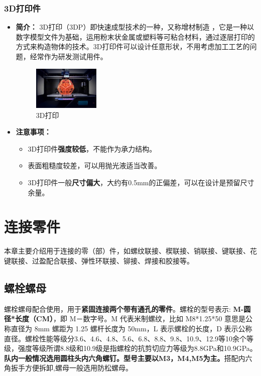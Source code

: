 \documentclass[UTF8]{article} %
\begin{document}
\subsubsection{3D打印件}

\begin{itemize}
  \item \textbf{简介：} 3D打印（3DP）即快速成型技术的一种，又称增材制造 ，它是一种以数字模型文件为基础，运用粉末状金属或塑料等可粘合材料，通过逐层打印的方式来构造物体的技术。3D打印件可以设计任意形状，不用考虑加工工艺的问题，经常作为研发测试用件。
  
  \begin{figure}[h]
    \centering
    \includegraphics[width=0.3\textwidth]{3.png}
    \caption{3D打印}
  \end{figure}

  \item \textbf{注意事项：} 
  \begin{itemize}
    \item 3D打印件\textbf{强度较低}，不能作为承力结构。
    \item 表面粗糙度较差，可以用抛光液适当改善。
    \item 3D打印件一般\textbf{尺寸偏大}，大约有0.5mm的正偏差，可以在设计是预留尺寸余量。

  \end{itemize}

\end{itemize}

\section{连接零件}
本章主要介绍用于连接的零（部）件，如螺纹联接、楔联接、销联接、键联接、花键联接、过盈配合联接、弹性环联接、铆接、焊接和胶接等。
\subsection{螺栓螺母}
螺栓螺母配合使用，用于\textbf{紧固连接两个带有通孔的零件}。螺栓的型号表示: \textbf{M-圆径*长度（CM）}，即 M－数字号。M 代表米制螺纹，比如 M8*1.25*50 意思是公称直径为 8mm 螺距为 1.25 螺杆长度为 50mm，L 表示螺栓的长度，D 表示公称直径。螺栓性能等级分3.6、4.6、4.8、5.6、6.8、8.8、9.8、10.9、12.9等10余个等级，强度等级所谓8.8级和10.9级是指螺栓的抗剪切应力等级为8.8GPa和10.9GPa。\textbf{队内一般情况选用圆柱头内六角螺钉。型号主要以M3，M4,M5为主。}搭配内六角扳手方便拆卸,螺母一般选用防松螺母。
\end{document}
